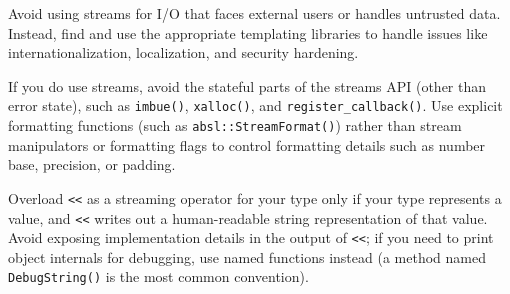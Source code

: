 Avoid using streams for I/O that faces external users or handles untrusted data. Instead, find and use the appropriate templating libraries to handle issues like internationalization, localization, and security hardening.

If you do use streams, avoid the stateful parts of the streams API (other than error state), such as \texttt{imbue()}, \texttt{xalloc()}, and \texttt{register_callback()}. Use explicit formatting functions (such as \texttt{absl::StreamFormat()}) rather than stream manipulators or formatting flags to control formatting details such as number base, precision, or padding.

Overload \texttt{<<} as a streaming operator for your type only if your type represents a value, and \texttt{<<} writes out a human-readable string representation of that value. Avoid exposing implementation details in the output of \texttt{<<}; if you need to print object internals for debugging, use named functions instead (a method named \texttt{DebugString()} is the most common convention).
